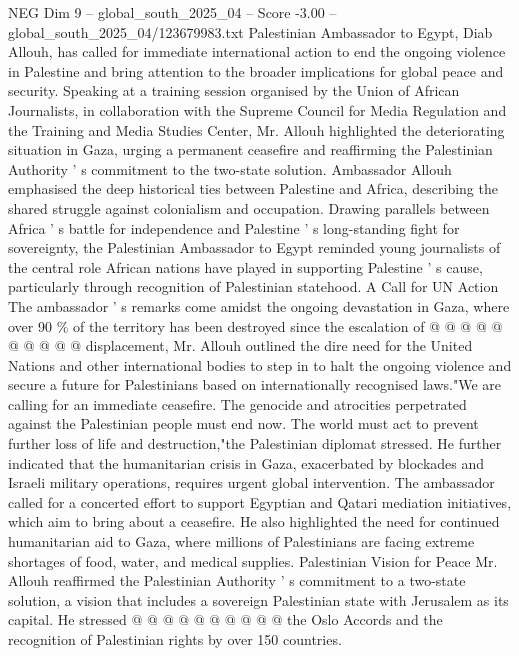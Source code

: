 \begin{textsample}{NEG Dim 9 – global\_south\_2025\_04 – Score -3.00 – global\_south\_2025\_04/123679983.txt}  \label{ex:f9_neg_267}
Palestinian Ambassador to Egypt, Diab Allouh, has called for immediate international action to end the ongoing violence in Palestine and bring attention to the broader implications for global peace and security.
Speaking at a training session organised by the Union of African Journalists, in collaboration with the Supreme Council for Media Regulation and the Training and Media Studies Center, Mr.
Allouh highlighted the deteriorating situation in Gaza, urging a permanent ceasefire and reaffirming the Palestinian Authority ' s commitment to the two-state solution.
Ambassador Allouh emphasised the deep historical ties between Palestine and Africa, describing the shared struggle against colonialism and occupation.
Drawing parallels between Africa ' s battle for independence and Palestine ' s long-standing fight for sovereignty, the Palestinian Ambassador to Egypt reminded young journalists of the central role African nations have played in supporting Palestine ' s cause, particularly through recognition of Palestinian statehood.
A Call for UN Action The ambassador ' s remarks come amidst the ongoing devastation in Gaza, where over 90 \% of the territory has been destroyed since the escalation of @ @ @ @ @ @ @ @ @ @ displacement, Mr.
Allouh outlined the dire need for the United Nations and other international bodies to step in to halt the ongoing violence and secure a future for Palestinians based on internationally recognised laws."We are calling for an immediate ceasefire.
The genocide and atrocities perpetrated against the Palestinian people must end now.
The world must act to prevent further loss of life and destruction,"the Palestinian diplomat stressed.
He further indicated that the humanitarian crisis in Gaza, exacerbated by blockades and Israeli military operations, requires urgent global intervention.
The ambassador called for a concerted effort to support Egyptian and Qatari mediation initiatives, which aim to bring about a ceasefire.
He also highlighted the need for continued humanitarian aid to Gaza, where millions of Palestinians are facing extreme shortages of food, water, and medical supplies.
Palestinian Vision for Peace Mr.
Allouh reaffirmed the Palestinian Authority ' s commitment to a two-state solution, a vision that includes a sovereign Palestinian state with Jerusalem as its capital.
He stressed @ @ @ @ @ @ @ @ @ @ the Oslo Accords and the recognition of Palestinian rights by over 150 countries.

\end{textsample}
